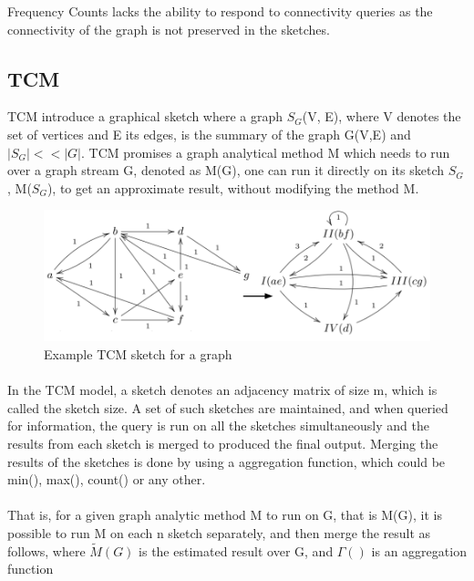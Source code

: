 \documentclass[12pt]{report}
\numberwithin{figure}{section}
\numberwithin{table}{section}
\begin{document}
Frequency Counts lacks the ability to respond to connectivity queries as the connectivity of the graph is not preserved in the sketches\cite{TCM}.

\subsection{TCM}

TCM\cite{TCM} introduce a graphical sketch where a graph $S_G$(V, E), where V denotes the set of vertices and E its edges, is the summary of the graph G(V,E) and $|S_G| << |G|$. TCM promises a graph analytical method M which needs to run over a graph stream G, denoted as M(G), one can run it directly on its sketch $S_G$, M($S_G$), to get an approximate result, without modifying the method M.

\begin{figure}[H]
\centering
\includegraphics[scale=0.3]{images/graph-sketching}
\caption{Example TCM sketch for a graph}
\end{figure}

\paragraph{}

In the TCM model, a sketch denotes an adjacency matrix of size m, which is called the sketch size. A set of such sketches are maintained, and when queried for information, the query is run on all the sketches simultaneously and the results from each sketch is merged to produced the final output. Merging the results of the sketches is done by using a aggregation function, which could be min(), max(), count() or any other. 

\paragraph{}

That is, for a given graph analytic method M to run on G, that is M(G), it is possible to run M on each n sketch separately, and then merge the result as follows, where $\tilde{M}(G)$ is the estimated result over G, and $\Gamma()$ is an aggregation function 
\end{document}
